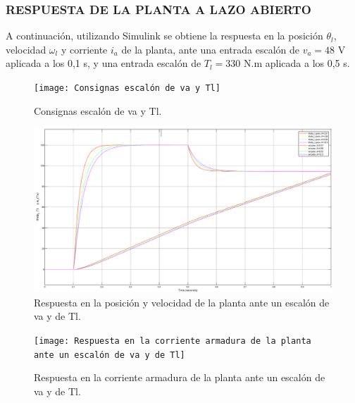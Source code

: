 \documentclass{article}
\begin{document}
\begin{sloppypar}
\subsubsection{RESPUESTA DE LA PLANTA A LAZO ABIERTO}
\label{sec:RESPUESTA DE LA PLANTA A LAZO ABIERTO}

A continuación, utilizando Simulink se obtiene la respuesta en la posición $\theta_l$, velocidad $\omega_l$ y corriente $i_a$ de la planta, ante una entrada escalón de $v_a=48$ V aplicada a los 0,1 s, y una entrada escalón de $T_l=330$ N.m aplicada a los 0,5 s.

\begin{figure}[H]
    \centering
    \texttt{[image: Consignas escalón de va y Tl]}
    \caption{Consignas escalón de va y Tl.}
    \label{fig:Consignas escalón de va y Tl}
\end{figure}

\begin{figure}[H]
    \centering
    \includegraphics[width=1\textwidth]{Respuesta en la posición y velocidad de la planta ante un escalón de va y de Tl}
    \caption{Respuesta en la posición y velocidad de la planta ante un escalón de va y de Tl.}
    \label{fig:Respuesta en la posición y velocidad de la planta ante un escalón de va y de Tl}
\end{figure}

\begin{figure}[H]
    \centering
    \texttt{[image: Respuesta en la corriente armadura de la planta ante un escalón de va y de Tl]}
    \caption{Respuesta en la corriente armadura de la planta ante un escalón de va y de Tl.}
    \label{fig:Respuesta en la corriente armadura de la planta ante un escalón de va y de Tl}
\end{figure}


\end{sloppypar}
\end{document}
